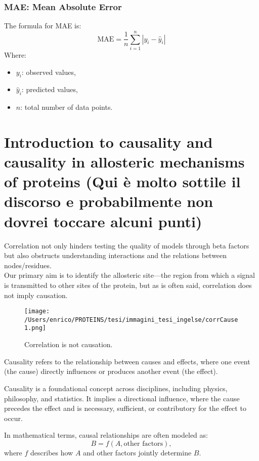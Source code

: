 \documentclass[English, Lau, oneside]{sapthesis}
\begin{document}
\subsection{MAE: Mean Absolute Error}
\noindent The formula for MAE is:
\[
\text{MAE} = \frac{1}{n} \sum_{i=1}^n |y_i - \hat{y}_i|
\]
Where:
\begin{itemize}
    \item \(y_i\): observed values,
    \item \(\hat{y}_i\): predicted values,
    \item \(n\): total number of data points.
\end{itemize}

\newpage
\chapter{Introduction to causality and causality in allosteric mechanisms of proteins (Qui è molto sottile il discorso e probabilmente non dovrei toccare alcuni punti)}

\noindent Correlation not only hinders testing the quality of models through beta factors but also obstructs understanding interactions and the relations between nodes/residues.\\
Our primary aim is to identify the allosteric site—the region from which a signal is transmitted to other sites of the protein, but as is often said, correlation does not imply causation.

\begin{figure}[h]
    \centering
    \texttt{[image: /Users/enrico/PROTEINS/tesi/immagini\_tesi\_ingelse/corrCause1.png]}    
    \caption{Correlation is not causation.}
    \label{fig:Correlation is not causation}
\end{figure}

Causality refers to the relationship between causes and effects, where one event (the cause) directly influences or produces another event (the effect). 

Causality is a foundational concept across disciplines, including physics, philosophy, and statistics. It implies a directional influence, where the cause precedes the effect and is necessary, sufficient, or contributory for the effect to occur.

In mathematical terms, causal relationships are often modeled as:\cite{ref14}
\[
B = f(A, \text{other factors}),
\]
where \( f \) describes how \( A \) and other factors jointly determine \( B \). 
\end{document}
